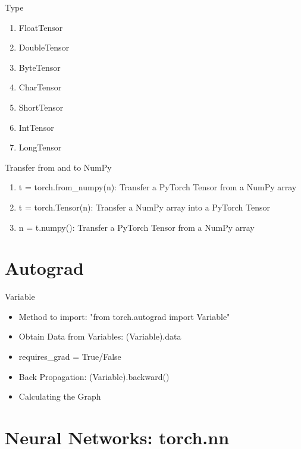 \documentclass[english, nochinese]{../TeXTemplate/pkuslide}
\begin{document}
\begin{frame}{Type}
\begin{enumerate}
    \item FloatTensor
	\item DoubleTensor
	\item ByteTensor
	\item CharTensor
	\item ShortTensor
	\item IntTensor
	\item LongTensor
\end{enumerate}
\end{frame}

\begin{frame}{Transfer from and to NumPy}
\begin{enumerate}
	\item t = torch.from\_numpy(n): Transfer a PyTorch Tensor from a NumPy array
	\item t = torch.Tensor(n): Transfer a NumPy array into a PyTorch Tensor
	\item n = t.numpy(): Transfer a PyTorch Tensor from a NumPy array
\end{enumerate}
\end{frame}

\section{Autograd}

\begin{frame}
\sectionpage
\end{frame}


\begin{frame}{Variable}
\begin{itemize}
	\item Method to import: "from torch.autograd import Variable"
	\item Obtain Data from Variables: (Variable).data
	\item requires\_grad = True/False
	\item Back Propagation: (Variable).backward()
	\item Calculating the Graph
\end{itemize}
\end{frame}

\section{Neural Networks: torch.nn}
\end{document}
